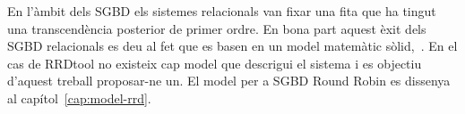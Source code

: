 En l'àmbit dels SGBD els sistemes relacionals van fixar una fita que ha tingut una transcendència posterior de  primer ordre. En bona part aquest èxit dels SGBD relacionals es deu al fet que es basen en un model matemàtic sòlid,~\cite{date}.
En el cas de RRDtool no existeix  cap model que descrigui el sistema i es objectiu d'aquest treball proposar-ne un. El model per a SGBD Round Robin es dissenya  al capítol~\ref{cap:model-rrd}.








